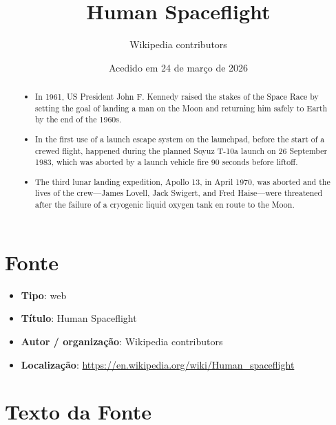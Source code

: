\documentclass[12pt]{article}
\title{Human Spaceflight}
\author{Wikipedia contributors}
\date{Acedido em 24 de março de 2026}
\begin{document}
\maketitle

\begin{abstract}
\begin{itemize}
\item In 1961, US President John F. Kennedy raised the stakes of the Space Race by setting the goal of landing a man on the Moon and returning him safely to Earth by the end of the 1960s.
\item In the first use of a launch escape system on the launchpad, before the start of a crewed flight, happened during the planned Soyuz T-10a launch on 26 September 1983, which was aborted by a launch vehicle fire 90 seconds before liftoff.
\item The third lunar landing expedition, Apollo 13, in April 1970, was aborted and the lives of the crew—James Lovell, Jack Swigert, and Fred Haise—were threatened after the failure of a cryogenic liquid oxygen tank en route to the Moon.
\end{itemize}
\end{abstract}

\section{Fonte}

\begin{itemize}
\item \textbf{Tipo}: web
\item \textbf{Título}: Human Spaceflight
\item \textbf{Autor / organização}: Wikipedia contributors
\item \textbf{Localização}: \url{https://en.wikipedia.org/wiki/Human_spaceflight}
\end{itemize}

\section{Texto da Fonte}
\end{document}
